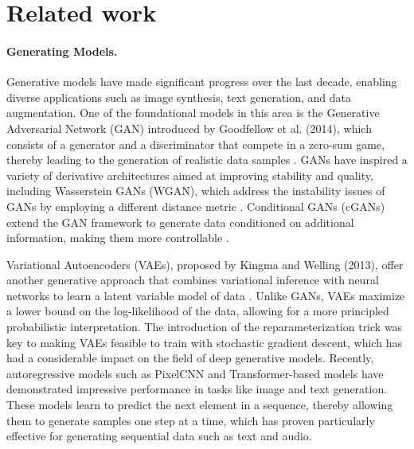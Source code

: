 \section{Related work} \label{sec:related_work}

\paragraph{Generating Models.}
Generative models have made significant progress over the last decade, enabling diverse applications such as image synthesis, text generation, and data augmentation. One of the foundational models in this area is the Generative Adversarial Network (GAN) introduced by Goodfellow et al. (2014), which consists of a generator and a discriminator that compete in a zero-sum game, thereby leading to the generation of realistic data samples \cite{goodfellow2014generative}. GANs have inspired a variety of derivative architectures aimed at improving stability and quality, including Wasserstein GANs (WGAN), which address the instability issues of GANs by employing a different distance metric \cite{arjovsky2017wasserstein}. Conditional GANs (cGANs) extend the GAN framework to generate data conditioned on additional information, making them more controllable \cite{mirza2014conditional}. 

Variational Autoencoders (VAEs), proposed by Kingma and Welling (2013), offer another generative approach that combines variational inference with neural networks to learn a latent variable model of data \cite{kingma2013auto}. Unlike GANs, VAEs maximize a lower bound on the log-likelihood of the data, allowing for a more principled probabilistic interpretation. The introduction of the reparameterization trick was key to making VAEs feasible to train with stochastic gradient descent, which has had a considerable impact on the field of deep generative models. Recently, autoregressive models such as PixelCNN \cite{oord2016pixel} and Transformer-based models \cite{vaswani2017attention} have demonstrated impressive performance in tasks like image and text generation. These models learn to predict the next element in a sequence, thereby allowing them to generate samples one step at a time, which has proven particularly effective for generating sequential data such as text and audio. 

